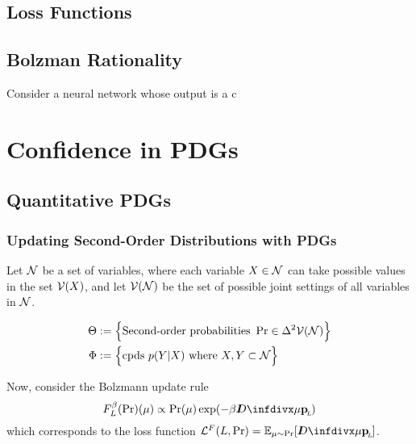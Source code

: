 \documentclass{article}
\begin{document}
\subsection{Loss Functions}
\subsection{Bolzman Rationality}

\begin{examplex}{}{}
	Consider a neural network whose output is a c
\end{examplex}

\section{Confidence in PDGs}
\subsection{Quantitative PDGs}

\subsubsection{Updating Second-Order Distributions with PDGs}
Let $\mathcal N$ be a set of variables, where each variable $X \in \mathcal N$ can take possible values in the set $\mathcal V(X)$, and let $\mathcal V(\mathcal N)$ be the set of possible joint settings of all variables in $\mathcal N$.

\begin{align*}
	\Theta &:=
		\Big\{
		\text{Second-order probabilities}~ \Pr \in \Delta^2 \mathcal V(\mathcal N)
		\Big\} \\
	\Phi &:= \Big\{ \text{cpds}~ p(Y|X)
		\text{ where }  X, Y \subset \mathcal N \Big\}
\end{align*}

Now, consider the Bolzmann update rule
\[
	F_L^{\beta}(\Pr) (\mu) \propto \Pr(\mu) \exp(-\beta \kldiv\mu \bp)
\]
which corresponds to the loss function
$\mathcal L^F(L, \Pr) = \Ex_{\mu \sim \Pr}[\kldiv\mu{\bp}]$.
\end{document}
